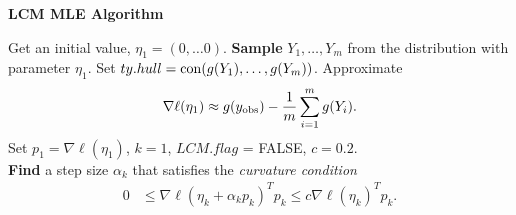 {\small
\noindent \textbf{LCM MLE Algorithm}

\noindent \begin{algorithmic}[1]
\State Get an initial value, $\eta_1 = (0, \ldots 0)$.
\State \textbf{Sample} $Y_1, \ldots, Y_m$ from the distribution with parameter $\eta_{1}$.  
\State Set $ty.hull = \operatorname{con}(g(Y_1), \ldots, g(Y_m) )$.
\State Approximate 
\begin{align*}
\nabla \ell( \eta_1) \approx g(y_{\text{obs}}) - \frac{1}{m}\sum_{i=1}^m g(Y_i).
\end{align*}
\State Set $p_1 = \nabla \ell( \eta_1)$, $k=1$, $LCM.flag$ = FALSE, $c=0.2$.\\

\State \textbf{Find} a step size $\alpha_k$ that satisfies the \textit{curvature condition}
\begin{align*}%
	 0 & \leq \nabla \ell( \eta_k + \alpha_k p_k)^T p_k \leq c \nabla \ell(\eta_k)^T p_k.
\end{align*}


\end{algorithmic}}
